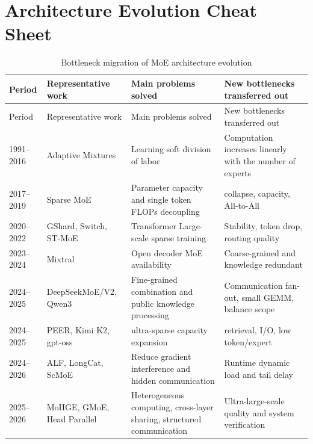\documentclass[10pt,a4paper,fontset=none]{ctexart}
\def\BilingualAnchorPrefix{en}
\let\BilingualOriginalAppendix\appendix
\renewcommand{\appendix}{%
  \BilingualOriginalAppendix
  \renewcommand*{\theHsection}{\BilingualAnchorPrefix.appendix.\Alph{section}}%
}
\begin{document}
\appendix
\section{Architecture Evolution Cheat Sheet}

\begin{longtable}{@{}p{}p{}p{}p{}@{}}
\caption{Bottleneck migration of MoE architecture evolution}\label{en:tab:timeline}\\
\toprule
Period & Representative work & Main problems solved & New bottlenecks transferred out \\
\midrule
\endfirsthead
\toprule
Period & Representative work & Main problems solved & New bottlenecks transferred out \\
\midrule
\endhead
1991--2016 & Adaptive Mixtures & Learning soft division of labor & Computation increases linearly with the number of experts \\
2017--2019 & Sparse MoE & Parameter capacity and single token FLOPs decoupling & collapse, capacity, All-to-All \\
2020--2022 & GShard, Switch, ST-MoE & Transformer Large-scale sparse training & Stability, token drop, routing quality \\
2023--2024 & Mixtral & Open decoder MoE availability & Coarse-grained and knowledge redundant \\
2024--2025 & DeepSeekMoE/V2, Qwen3 & Fine-grained combination and public knowledge processing & Communication fan-out, small GEMM, balance scope \\
2024--2025 & PEER, Kimi K2, gpt-oss & ultra-sparse capacity expansion & retrieval, I/O, low token/expert \\
2024--2026 & ALF, LongCat, ScMoE & Reduce gradient interference and hidden communication & Runtime dynamic load and tail delay \\
2025--2026 & MoHGE, GMoE, Head Parallel & Heterogeneous computing, cross-layer sharing, structured communication & Ultra-large-scale quality and system verification \\
\bottomrule
\end{longtable}
\end{document}
